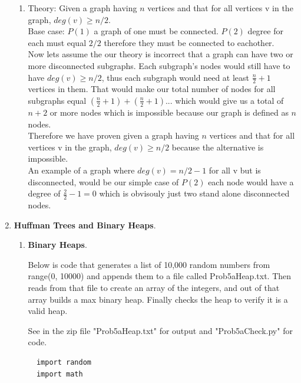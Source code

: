 \documentclass{article}
\begin{document}
\begin{enumerate}
\begin{enumerate}
      \item Theory: Given a graph having $n$ vertices and that for all vertices v in the graph, $deg(v) \geq n/2$.\\
      
      Base case: $P(1)$ a graph of one must be connected. $P(2)$ degree for each must equal $2/2$ therefore they must be connected to eachother.\\

      Now lets assume the our theory is incorrect that a graph can have two or more disconnected subgraphs. Each subgraph's nodes would still have to have $deg(v) \geq n/2$, thus each subgraph would need at least $\frac{n}{2} + 1$ vertices in them.
      That would make our total number of nodes for all subgraphs equal $(\frac{n}{2} + 1) + (\frac{n}{2} + 1) ...$ which would give us a total of $n + 2$ or more nodes which is impossible because our graph is defined as $n$ nodes.\\

      Therefore we have proven given a graph having $n$ vertices and that for all vertices v in the graph, $deg(v) \geq n/2$ because the alternative is impossible.\\

      An example of a graph where $deg(v) = n/2 -1$ for all v but is disconnected, would be our simple case of $P(2)$ each node would have a degree of $\frac{2}{2} - 1 = 0$ which is obvisouly just two stand alone disconnected nodes.
    \end{enumerate}

    \item \textbf{Huffman Trees and Binary Heaps}.
    
    \begin{enumerate}
      
      \item \textbf{Binary Heaps}.
  
        Below is code that generates a list of 10,000 random numbers from range(0, 10000) and appends them to a file called Prob5aHeap.txt. 
        Then reads from that file to create an array of the integers, and out of that array builds a max binary heap. 
        Finally checks the heap to verify it is a valid heap.

        See in the zip file "Prob5aHeap.txt" for output and "Prob5aCheck.py" for code.

        \begin{lstlisting}
  import random
  import math     
  

\end{lstlisting}
\end{enumerate}
\end{enumerate}
\end{document}
